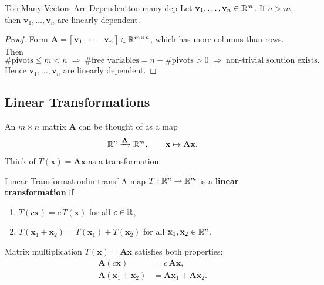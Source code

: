 \begin{theorem}{Too Many Vectors Are Dependent}{too-many-dep}
  Let $\mathbf{v}_1, \ldots, \mathbf{v}_n \in \mathbb{R}^m$. If $n > m$, then $\mathbf{v}_1, \ldots, \mathbf{v}_n$ are linearly dependent.
\end{theorem}

\begin{proof}
  Form $\mathbf{A} = \bigl[\,\mathbf{v}_1 \;\; \cdots \;\; \mathbf{v}_n\,\bigr] \in \mathbb{R}^{m \times n}$, which has more columns than rows. Then
  \[
    \#\text{pivots} \leq m < n
    \;\Longrightarrow\; \#\text{free variables} = n - \#\text{pivots} > 0
    \;\Longrightarrow\; \text{non-trivial solution exists}.
  \]
  Hence $\mathbf{v}_1, \ldots, \mathbf{v}_n$ are linearly dependent.
\end{proof}

\subsection{Linear Transformations}

An $m \times n$ matrix $\mathbf{A}$ can be thought of as a map
\[
  \mathbb{R}^n \xrightarrow{\mathbf{A}} \mathbb{R}^m, \qquad \mathbf{x} \mapsto \mathbf{A}\mathbf{x}.
\]
Think of $T(\mathbf{x}) = \mathbf{A}\mathbf{x}$ as a transformation.

\begin{definition}{Linear Transformation}{lin-transf}
  A map $T: \mathbb{R}^n \to \mathbb{R}^m$ is a \textbf{linear transformation} if
  \begin{enumerate}
    \item $T(c\mathbf{x}) = c\, T(\mathbf{x})$ for all $c \in \mathbb{R}$,
    \item $T(\mathbf{x}_1 + \mathbf{x}_2) = T(\mathbf{x}_1) + T(\mathbf{x}_2)$ for all $\mathbf{x}_1, \mathbf{x}_2 \in \mathbb{R}^n$.
  \end{enumerate}
\end{definition}

Matrix multiplication $T(\mathbf{x}) = \mathbf{A}\mathbf{x}$ satisfies both properties:
\begin{align*}
  \mathbf{A}(c\mathbf{x})                 & = c\, \mathbf{A}\mathbf{x},                        \\
  \mathbf{A}(\mathbf{x}_1 + \mathbf{x}_2) & = \mathbf{A}\mathbf{x}_1 + \mathbf{A}\mathbf{x}_2.
\end{align*}

